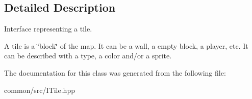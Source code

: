 \subsection{Detailed Description}
Interface representing a tile. 

A tile is a \char`\"{}block\char`\"{} of the map. It can be a wall, a empty block, a player, etc. It can be described with a type, a color and/or a sprite. 

The documentation for this class was generated from the following file\+:\begin{DoxyCompactItemize}
\item 
common/src/I\+Tile.\+hpp\end{DoxyCompactItemize}
